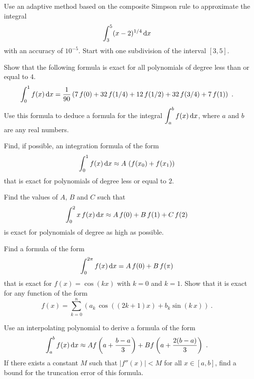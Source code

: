 \begin{question}
Use an adaptive method based on the composite Simpson rule to approximate
the integral
\[
\int_3^5 (x-2)^{1/4} \,\mathrm{d}x
\]
with an accuracy of $10^{-5}$.  Start with one subdivision of the
interval $[3,5]$.
\label{diffQ15}
\end{question}

\begin{question}
Show that the following formula is exact for all polynomials of degree
less than or equal to $4$.
\begin{equation}\label{NF01}
\int_0^1 f(x)\,\mathrm{d}x = \frac{1}{90}\left(7\,f(0)+32\,f(1/4) +
  12\,f(1/2) + 32\,f(3/4) + 7\,f(1)\right) \ .
\end{equation}
Use this formula to deduce a formula for the integral
$\displaystyle \int_a^b f(x)\,\mathrm{d}x$, where $a$ and $b$ are any real
numbers.
\label{diffQ16}
\end{question}

\begin{question}
Find, if possible, an integration formula of the form
\[
\int_0^1 f(x) \,\mathrm{d}x \approx A\,\left( f(x_0)+f(x_1)\right)
\]
that is exact for polynomials of degree less or equal to $2$.
\label{diffQ17}
\end{question}

\begin{question}
Find the values of $A$, $B$ and $C$ such that
\[
\int_0^2 x\,f(x)\,\mathrm{d}x \approx A\,f(0) + B \,f(1) + C\,f(2)
\]
is exact for polynomials of degree as high as possible.
\label{diffQ18}
\end{question}

\begin{question}
Find a formula of the form
\[
\int_0^{2\pi} f(x) \,\mathrm{d}x = A\,f(0) + B\,f(\pi)
\]
that is exact for $f(x)=\cos(kx)$ with $k=0$ and $k=1$.
Show that it is exact for any function of the form
\begin{equation}\label{QuestFourierType}
f(x) = \sum_{k=0}^n \left(a_k\,\cos((2k+1)x) + b_k\sin(k\,x)\right) \ .
\end{equation}
\label{diffQ19}
\end{question}

\begin{question}
Use an interpolating polynomial to derive a formula of the form
\[
\int_a^b f(x) \,\mathrm{d}x \approx A f\left( a + \frac{b-a}{3}\right)
+ B f\left(a + \frac{2(b-a)}{3}\right) \ .
\]
If there exists a constant $M$ such that $|f''(x)|<M$ for all
$x\in [a,b]$, find a bound for the truncation error of this
formula.
\label{diffQ20}
\end{question}

